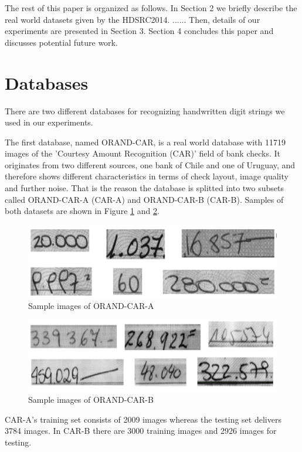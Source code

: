 The rest of this paper is organized as follows. In Section 2 we briefly describe the real world datasets given by the HDSRC2014. ...... Then, details of our experiments are presented in Section 3. Section 4 concludes this paper and discusses potential future work.

\section{Databases} \label{Datasets}
There are two different databases for recognizing handwritten digit strings we used in our experiments.

The first database, named ORAND-CAR, is a real world database with 11719 images of the 'Courtesy Amount Recognition (CAR)' field of bank checks. It originates from two different sources, one bank of Chile and one of Uruguay, and therefore shows different characteristics in terms of check layout, image quality and further noise. That is the reason the database is splitted into two subsets called ORAND-CAR-A (CAR-A) and ORAND-CAR-B (CAR-B). Samples of both datasets are shown in Figure \ref{fig:carA} and \ref{fig:carB}.

\begin{figure}
  \includegraphics[width=\linewidth]{images/CAR-A-Splitted.png}
  \caption{Sample images of ORAND-CAR-A}
  \label{fig:carA}
\end{figure}

\begin{figure}
  \includegraphics[width=\linewidth]{images/CAR-B-Splitted.png}
  \caption{Sample images of ORAND-CAR-B}
  \label{fig:carB}
\end{figure}

CAR-A's training set consists of 2009 images whereas the testing set delivers 3784 images. In CAR-B there are 3000 training images and 2926 images for testing.

